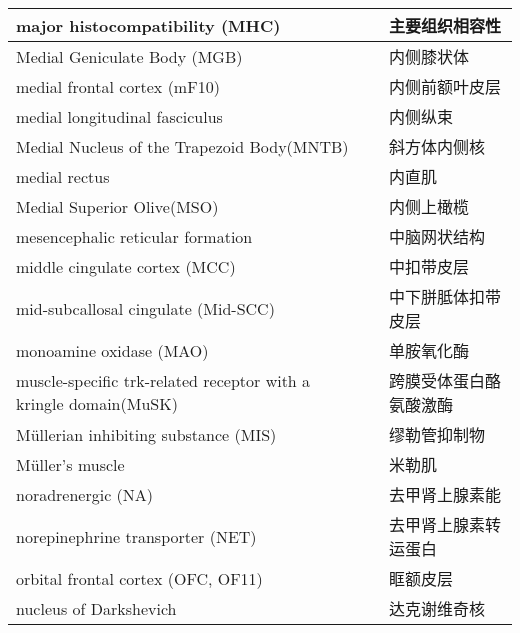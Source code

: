 \begin{longtable}{lll}
	\midrule
	major histocompatibility (MHC)   && 主要组织相容性  \\
	
	\midrule
	Medial Geniculate Body (MGB)   && 内侧膝状体  \\
	
	\midrule
	medial frontal cortex (mF10)   && 内侧前额叶皮层  \\
	
	\midrule
	medial longitudinal fasciculus   && 内侧纵束  \\
	
	\midrule
	Medial Nucleus of the Trapezoid Body(MNTB)   && 斜方体内侧核  \\
	
	\midrule
	medial rectus    && 内直肌  \\
	
	\midrule
	Medial Superior Olive(MSO)   && 内侧上橄榄  \\
	
	\midrule
	mesencephalic reticular formation   && 中脑网状结构  \\
	
	\midrule
	middle cingulate cortex (MCC)   && 中扣带皮层  \\
	
	\midrule
	mid-subcallosal cingulate (Mid-SCC)  && 中下胼胝体扣带皮层  \\
	
	\midrule
	monoamine oxidase (MAO)   && 单胺氧化酶  \\
	
	\midrule
	muscle-specific trk-related receptor with a
	kringle domain(MuSK)   && 跨膜受体蛋白酪氨酸激酶  \\
	
	\midrule
	Müllerian inhibiting substance (MIS)   && 缪勒管抑制物  \\
	
	\midrule
	Müller's muscle   && 米勒肌  \\
	
	\midrule
	noradrenergic (NA)   && 去甲肾上腺素能 \\
	
	\midrule
	norepinephrine transporter (NET)   && 去甲肾上腺素转运蛋白 \\
	
	\midrule
	orbital frontal cortex (OFC, OF11)   && 眶额皮层 \\
	
	\midrule
	nucleus of Darkshevich   && 达克谢维奇核  \\
	

\end{longtable}

